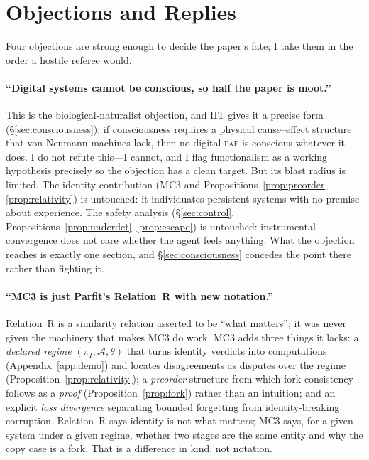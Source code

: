 \documentclass[11pt,a4paper]{article}
\theoremstyle{definition}
\newcommand{\pae}{\textsc{pae}\xspace}
\begin{document}
\section{Objections and Replies}
\label{sec:objections}

Four objections are strong enough to decide the paper's fate; I take them in the order a hostile referee would.

\paragraph{``Digital systems cannot be conscious, so half the paper is moot.''} This is the biological-naturalist objection, and IIT gives it a precise form (\S\ref{sec:consciousness}): if consciousness requires a physical cause--effect structure that von Neumann machines lack, then no digital \pae{} is conscious whatever it does. I do not refute this---I cannot, and I flag functionalism as a working hypothesis precisely so the objection has a clean target. But its blast radius is limited. The identity contribution (MC3 and Propositions~\ref{prop:preorder}--\ref{prop:relativity}) is untouched: it individuates persistent systems with no premise about experience. The safety analysis (\S\ref{sec:control}, Propositions~\ref{prop:underdet}--\ref{prop:escape}) is untouched: instrumental convergence does not care whether the agent feels anything. What the objection reaches is exactly one section, and \S\ref{sec:consciousness} concedes the point there rather than fighting it.

\paragraph{``MC3 is just Parfit's Relation~R with new notation.''} Relation~R is a similarity relation asserted to be ``what matters''; it was never given the machinery that makes MC3 do work. MC3 adds three things it lacks: a \emph{declared regime} $(\pi_I,\mathcal{A},\theta)$ that turns identity verdicts into computations (Appendix~\ref{app:demo}) and locates disagreements as disputes over the regime (Proposition~\ref{prop:relativity}); a \emph{preorder} structure from which fork-consistency follows as a \emph{proof} (Proposition~\ref{prop:fork}) rather than an intuition; and an explicit \emph{loss divergence} separating bounded forgetting from identity-breaking corruption. Relation~R says identity is not what matters; MC3 says, for a given system under a given regime, whether two stages are the same entity and why the copy case is a fork. That is a difference in kind, not notation.
\end{document}
